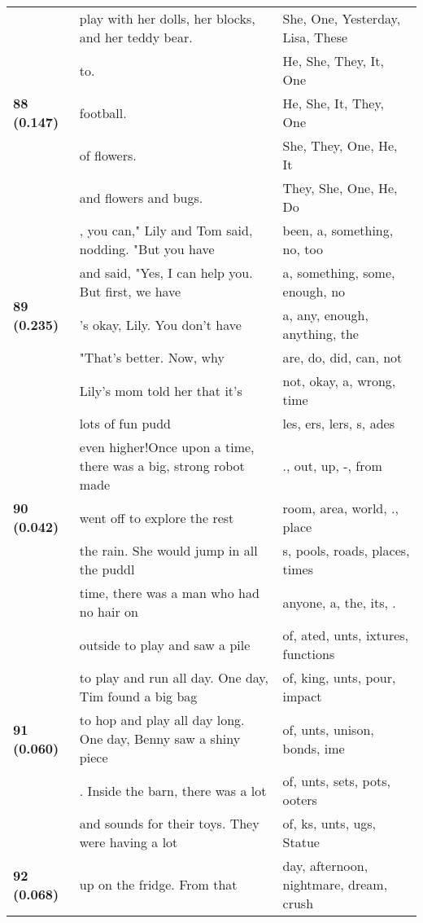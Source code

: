 \documentclass{article}
\begin{document}
\begin{adjustbox}{max width=\textwidth}
\begin{tabular}{p{} p{} p{}}
\midrule
\multirow{5}{*}{\textbf{88 (0.147)}} & play with her dolls, her blocks, and her teddy bear. & She,  One,  Yesterday,  Lisa,  These \\
 & to. & He,  She,  They,  It,  One \\
 & football. & He,  She,  It,  They,  One \\
 & of flowers. & She,  They,  One,  He,  It \\
 & and flowers and bugs. & They,  She,  One,  He,  Do \\
\midrule
\multirow{5}{*}{\textbf{89 (0.235)}} & , you can," Lily and Tom said, nodding. "But you have & been,  a,  something,  no,  too \\
 & and said, "Yes, I can help you. But first, we have & a,  something,  some,  enough,  no \\
 & 's okay, Lily. You don't have & a,  any,  enough,  anything,  the \\
 & "That's better. Now, why & are,  do,  did,  can,  not \\
 & Lily's mom told her that it's & not,  okay,  a,  wrong,  time \\
\midrule
\multirow{5}{*}{\textbf{90 (0.042)}} & lots of fun pudd & les, ers, lers, s, ades \\
 & even higher!Once upon a time, there was a big, strong robot made & .,  out,  up, -,  from \\
 & went off to explore the rest & room,  area,  world, .,  place \\
 & the rain. She would jump in all the puddl & s,  pools,  roads,  places,  times \\
 & time, there was a man who had no hair on & anyone,  a,  the,  its, . \\
\midrule
\multirow{5}{*}{\textbf{91 (0.060)}} & outside to play and saw a pile & of, ated, unts, ixtures,  functions \\
 & to play and run all day. One day, Tim found a big bag & of, king, unts, pour,  impact \\
 & to hop and play all day long. One day, Benny saw a shiny piece & of, unts,  unison,  bonds, ime \\
 & . Inside the barn, there was a lot & of, unts, sets, pots, ooters \\
 & and sounds for their toys. They were having a lot & of, ks, unts, ugs,  Statue \\
\midrule
\multirow{5}{*}{\textbf{92 (0.068)}} & up on the fridge. From that & day,  afternoon,  nightmare,  dream,  crush \\

\end{tabular}
\end{adjustbox}
\end{document}
